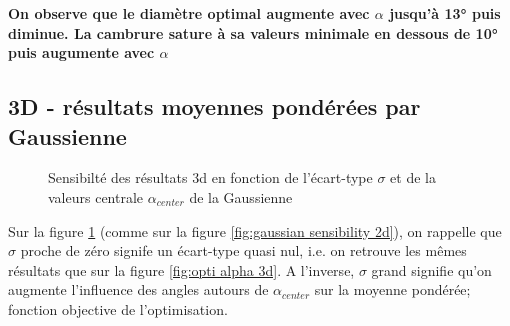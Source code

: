 \textbf{On observe que le diamètre optimal augmente avec $\alpha$ jusqu'à 13° puis diminue. La cambrure sature à sa valeurs minimale en dessous de 10° puis augumente avec $\alpha$ }

\subsection{3D - résultats moyennes pondérées par Gaussienne}
\label{sec:Ch3.3}

\begin{figure}[h!]
    \centering
    \hfill 
    \caption{Sensibilté des résultats 3d en fonction de l'écart-type $\sigma$ et de la valeurs centrale $\alpha_{center}$ de la Gaussienne}
    \label{fig:gaussian sensibility}
\end{figure}

    Sur la figure \ref{fig:gaussian sensibility} (comme sur la figure \ref{fig:gaussian sensibility 2d}), on rappelle que $\sigma$ proche de zéro signife un écart-type quasi nul, i.e. on retrouve les mêmes résultats que sur la figure \ref{fig:opti alpha 3d}. A l'inverse, $\sigma$ grand signifie qu'on augmente l'influence des angles autours de $\alpha_{center}$ sur la moyenne pondérée; fonction objective de l'optimisation. \\

